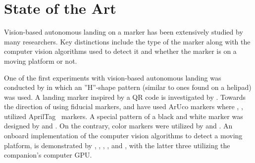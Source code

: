 \documentclass[conference]{IEEEtran}
\begin{document}
\section{State of the Art}
\label{sec:state-of-the-art}

Vision-based autonomous landing on a marker has been extensively
studied by many researchers. Key distinctions include the type of the marker along with the computer vision algorithms used to detect it and whether the marker is on a moving platform or not.

One of the first experiments with
vision-based autonomous landing was conducted by
\cite{saripalli2002vision}
in which an ”H”-shape
pattern (similar to ones found on a helipad) was used. %
A landing marker inspired by a QR code 
is investigated by 
\cite{yuan2018hierarchical}. Towards the direction of using fiducial markers, \cite{lee2012autonomous} and \cite{yang2018hybrid} have used ArUco markers where \cite{araar2017vision}, \cite{kyristsis2016towards}, \cite{feng2018autonomous} utilized AprilTag~\cite{olson2011apriltag} markers. A special pattern of a black and white marker was designed by \cite{nguyen2018lightdenseyolo} and \cite{falanga2017vision}. On the contrary, color markers were utilized by \cite{chen2016system} and \cite{lee2016vision}.  
%
%
An onboard implementation of the computer vision algorithms to detect a moving platform, is demonstrated by \cite{chen2016system}, \cite{lee2016vision}, \cite{falanga2017vision}, \cite{yang2018hybrid}, \cite{nguyen2018lightdenseyolo} and \cite{kyristsis2016towards}, with the latter three utilizing the companion's computer GPU. 
%
\end{document}
